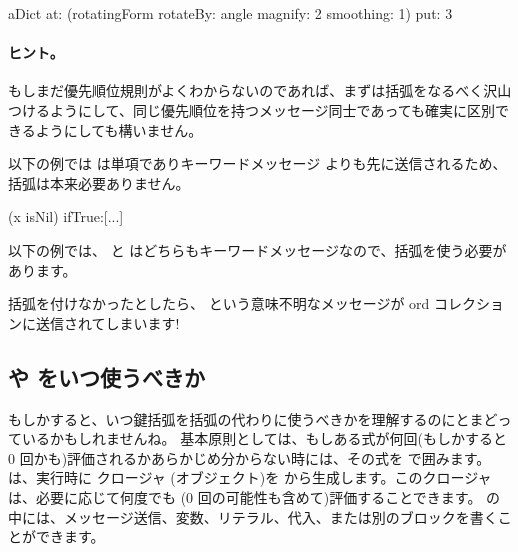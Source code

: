 \documentclass[a4paper,10pt,twoside]{book}
\begin{document}
\begin{code}{}
aDict
   at: (rotatingForm 
          rotateBy: angle	
          magnify: 2 
          smoothing: 1)
   put: 3
\end{code}



\paragraph{ヒント。} もしまだ優先順位規則がよくわからないのであれば、まずは括弧をなるべく沢山つけるようにして、同じ優先順位を持つメッセージ同士であっても確実に区別できるようにしても構いません。

以下の例では  は単項でありキーワードメッセージ  よりも先に送信されるため、括弧は本来必要ありません。
\begin{code}{}
(x isNil)
   ifTrue:[...]
\end{code}

以下の例では、 と  はどちらもキーワードメッセージなので、括弧を使う必要があります。
\noindent
括弧を付けなかったとしたら、 という意味不明なメッセージが ord コレクションに送信されてしまいます!

\subsection{\lct{[ ]} や \lct{( )} をいつ使うべきか}
もしかすると、いつ鍵括弧を括弧の代わりに使うべきかを理解するのにとまどっているかもしれませんね。
基本原則としては、もしある式が何回(もしかすると 0 回かも)評価されるかあらかじめ分からない時には、その式を \ct{[ ]} で囲みます。
 は、実行時に  クロージャ (\ie オブジェクト)を  から生成します。このクロージャは、必要に応じて何度でも (0 回の可能性も含めて)評価することできます。\ct{[ ]} の中には、メッセージ送信、変数、リテラル、代入、または別のブロックを書くことができます。
\end{document}
